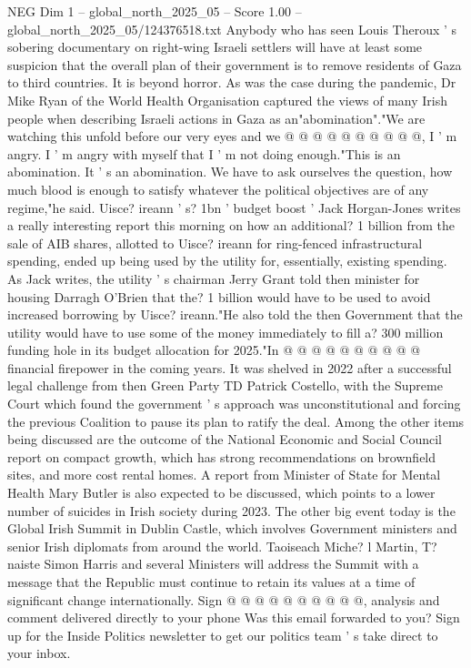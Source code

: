 \begin{textsample}{NEG Dim 1 – global\_north\_2025\_05 – Score 1.00 – global\_north\_2025\_05/124376518.txt}
Anybody who has seen Louis Theroux ' s sobering documentary on right-wing Israeli settlers will have at least some suspicion that the overall plan of their government is to remove residents of Gaza to third countries.
It is beyond horror.
As was the case during the pandemic, Dr Mike Ryan of the World Health Organisation captured the views of many Irish people when describing Israeli actions in Gaza as an"abomination"."We are watching this unfold before our very eyes and we @ @ @ @ @ @ @ @ @ @, I ' m angry.
I ' m angry with myself that I ' m not doing enough."This is an abomination.
It ' s an abomination.
We have to ask ourselves the question, how much blood is enough to satisfy whatever the political objectives are of any regime,"he said.
Uisce? ireann ' s? 1bn ' budget boost ' Jack Horgan-Jones writes a really interesting report this morning on how an additional? 1 billion from the sale of AIB shares, allotted to Uisce? ireann for ring-fenced infrastructural spending, ended up being used by the utility for, essentially, existing spending.
As Jack writes, the utility ' s chairman Jerry Grant told then minister for housing Darragh O'Brien that the? 1 billion would have to be used to avoid increased borrowing by Uisce? ireann."He also told the then Government that the utility would have to use some of the money immediately to fill a? 300 million funding hole in its budget allocation for 2025."In @ @ @ @ @ @ @ @ @ @ financial firepower in the coming years.
It was shelved in 2022 after a successful legal challenge from then Green Party TD Patrick Costello, with the Supreme Court which found the government ' s approach was unconstitutional and forcing the previous Coalition to pause its plan to ratify the deal.
Among the other items being discussed are the outcome of the National Economic and Social Council report on compact growth, which has strong recommendations on brownfield sites, and more cost rental homes.
A report from Minister of State for Mental Health Mary Butler is also expected to be discussed, which points to a lower number of suicides in Irish society during 2023.
The other big event today is the Global Irish Summit in Dublin Castle, which involves Government ministers and senior Irish diplomats from around the world.
Taoiseach Miche? l Martin, T? naiste Simon Harris and several Ministers will address the Summit with a message that the Republic must continue to retain its values at a time of significant change internationally.
Sign @ @ @ @ @ @ @ @ @ @, analysis and comment delivered directly to your phone Was this email forwarded to you?
Sign up for the Inside Politics newsletter to get our politics team ' s take direct to your inbox.

\end{textsample}
